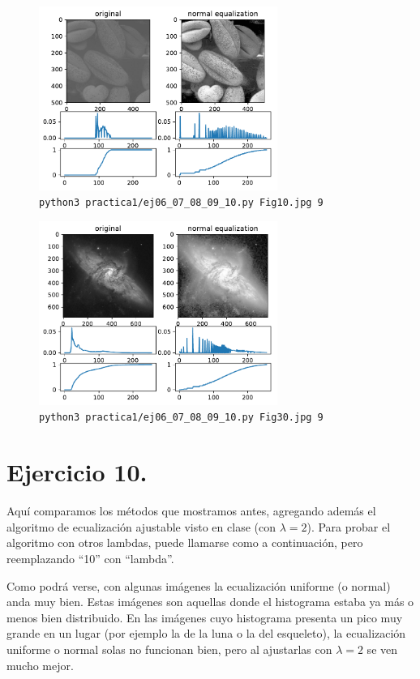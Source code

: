 \documentclass[11pt, spanish]{article}
\begin{document}
\begin{figure}[H]
\centering
  \includegraphics[height=6cm]{informe-imgs/ej09-1.pdf}
  \caption{\texttt{python3 practica1/ej06\_07\_08\_09\_10.py Fig10.jpg 9}}
\end{figure}

\begin{figure}[H]
\centering
  \includegraphics[height=6cm]{informe-imgs/ej09-2.pdf}
  \caption{\texttt{python3 practica1/ej06\_07\_08\_09\_10.py Fig30.jpg 9}}
\end{figure}


\section{Ejercicio 10.}
Aquí comparamos los métodos que mostramos antes, agregando además
el algoritmo de ecualización ajustable visto en clase (con $\lambda = 2$).
Para probar el algoritmo con otros lambdas, puede llamarse como a continuación,
pero reemplazando ``10'' con ``lambda''.

Como podrá verse, con algunas imágenes la ecualización uniforme (o normal) anda muy bien.
Estas imágenes son aquellas donde el histograma estaba ya más o menos bien distribuido.
En las imágenes cuyo histograma presenta un pico muy grande en un lugar
(por ejemplo la de la luna o la del esqueleto),
la ecualización uniforme o normal solas no funcionan bien,
pero al ajustarlas con $\lambda = 2$ se ven mucho mejor.
\end{document}
